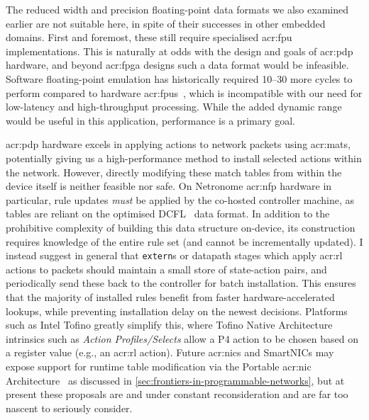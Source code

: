 The reduced width and precision floating-point data formats we also examined earlier are not suitable here, in spite of their successes in other embedded domains.
First and foremost, these still require specialised \gls{acr:fpu} implementations.
This is naturally at odds with the design and goals of \gls{acr:pdp} hardware, and beyond \gls{acr:fpga} designs such a data format would be infeasible.
Software floating-point emulation has historically required \qtyrange{10}{30}{\times} more cycles to perform compared to hardware \glspl{acr:fpu}~\parencite{DBLP:conf/arith/IordacheT03}, which is incompatible with our need for low-latency and high-throughput processing.
While the added dynamic range would be useful in this application, performance is a primary goal.

\gls{acr:pdp} hardware excels in applying actions to network packets using \glspl{acr:mat}, potentially giving us a high-performance method to install selected actions within the network.
However, directly modifying these match tables from within the device itself is neither feasible nor safe.
On Netronome \gls{acr:nfp} hardware in particular, rule updates \emph{must} be applied by the co-hosted controller machine, as tables are reliant on the optimised DCFL~\parencite{DBLP:conf/infocom/TaylorT05} data format.
In addition to the prohibitive complexity of building this data structure on-device, its construction requires knowledge of the entire rule set (and cannot be incrementally updated).
I instead suggest in general that \texttt{extern}s or datapath stages which apply \gls{acr:rl} actions to packets should maintain a small store of state-action pairs, and periodically send these back to the controller for batch installation.
This ensures that the majority of installed rules benefit from faster hardware-accelerated lookups, while preventing installation delay on the newest decisions.
Platforms such as Intel Tofino greatly simplify this, where Tofino Native Architecture intrinsics such as \emph{Action Profiles/Selects} allow a P4 action to be chosen based on a register value (e.g., an \gls{acr:rl} action).
Future \glspl{acr:nic} and SmartNICs may expose support for runtime table modification via the Portable \gls{acr:nic} Architecture~\parencite{p4-pna} as discussed in \cref{sec:frontiers-in-programmable-networks}, but at present these proposals are and under constant reconsideration and are far too nascent to seriously consider.

